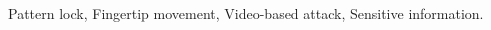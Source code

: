 \documentclass[journal,table,twoside]{IEEEtran}
\begin{document}
\maketitle



\begin{IEEEkeywords}
    Pattern lock, Fingertip movement, Video-based attack, Sensitive information.
\end{IEEEkeywords}












\IEEEpeerreviewmaketitle


\ifCLASSOPTIONcaptionsoff
  \newpage
\fi

\begin{spacing}{0.98}

\balance

\end{spacing}
\end{document}
